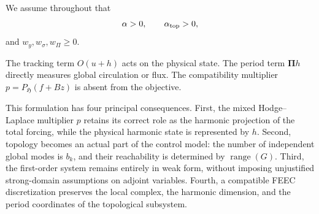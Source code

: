 \documentclass{article}
\DeclareMathOperator{\range}{range}
\newcommand{\HH}{\mathfrak H}
\newcommand{\Piop}{\boldsymbol\Pi}
\begin{document}
We assume throughout that
\begin{equation}\label{eq:positive-reg}
 \alpha>0,\qquad \alpha_{\rm top}>0,
\end{equation}
and $w_y,w_\sigma,w_\Pi\ge0$.

The tracking term $O(u+h)$ acts on the physical state. The period term $\Piop h$ directly measures global circulation or flux. The compatibility multiplier $p=P_{\HH}(f+Bz)$ is absent from the objective.


This formulation has four principal consequences. First, the mixed Hodge--Laplace multiplier $p$ retains its correct role as the harmonic projection of the total forcing, while the physical harmonic state is represented by $h$. Second, topology becomes an actual part of the control model: the number of independent global modes is $b_k$, and their reachability is determined by $\range(G)$. Third, the first-order system remains entirely in weak form, without imposing unjustified strong-domain assumptions on adjoint variables. Fourth, a compatible FEEC discretization preserves the local complex, the harmonic dimension, and the period coordinates of the topological subsystem.

\end{document}

